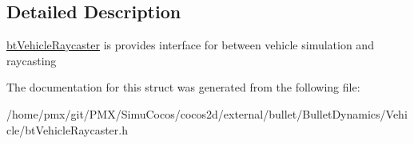 \subsection{Detailed Description}
\hyperlink{structbtVehicleRaycaster}{bt\+Vehicle\+Raycaster} is provides interface for between vehicle simulation and raycasting 

The documentation for this struct was generated from the following file\+:\begin{DoxyCompactItemize}
\item 
/home/pmx/git/\+P\+M\+X/\+Simu\+Cocos/cocos2d/external/bullet/\+Bullet\+Dynamics/\+Vehicle/bt\+Vehicle\+Raycaster.\+h\end{DoxyCompactItemize}
